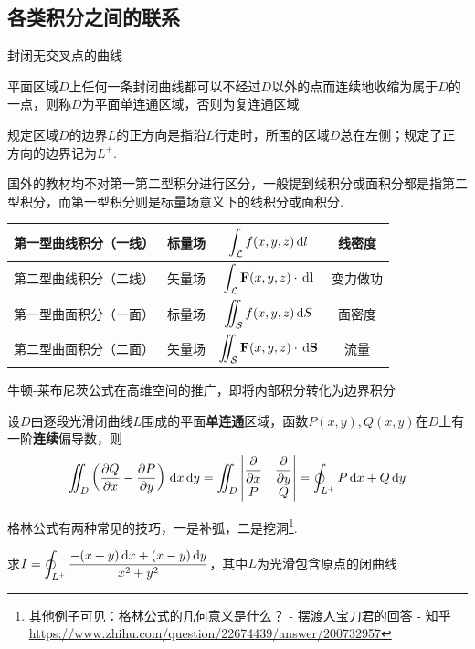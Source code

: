 \subsection{各类积分之间的联系}
\begin{definition}[简单闭曲线]
封闭无交叉点的曲线
\end{definition}
\begin{definition}[连通区域]
平面区域$D$上任何一条封闭曲线都可以不经过$D$以外的点而连续地收缩为属于$D$的一点，则称$D$为平面单连通区域，否则为复连通区域
\end{definition}
\par 规定区域$D$的边界$L$的正方向是指沿$L$行走时，所围的区域$D$总在左侧；规定了正方向的边界记为$L^+$.
\par 国外的教材均不对第一第二型积分进行区分，一般提到线积分或面积分都是指第二型积分，而第一型积分则是标量场意义下的线积分或面积分.
\begin{center}
\begin{tabular}{|c|c|c|c|}\hline
第一型曲线积分（一线） & 标量场 & $\displaystyle\int_{\mathcal{L}} f(x,y,z)\,\mathrm{d} l$ & 线密度\\\hline
第二型曲线积分（二线） & 矢量场 & $\displaystyle\int_{\mathcal{L}}\mathbf{F}(x,y,z)\cdot\,\mathrm{d}\mathbf{l}$ & 变力做功\\\hline
第一型曲面积分（一面） & 标量场 & $\displaystyle\iint_{\mathcal{S}} f(x,y,z)\,\mathrm{d} S$ & 面密度\\\hline
第二型曲面积分（二面） & 矢量场 & $\displaystyle\iint_{\mathcal{S}}\mathbf{F}(x,y,z)\cdot\,\mathrm{d}\mathbf{S}$ & 流量\\\hline
\end{tabular}
\end{center}
\par 牛顿-莱布尼茨公式在高维空间的推广，即将内部积分转化为边界积分
\begin{theorem}[格林(Green)公式]
设$D$由逐段光滑闭曲线$L$围成的平面\textbf{单连通}区域，函数$P(x,y),Q(x,y)$在$D$上有一阶\textbf{连续}偏导数，则
\[\iint_D\left(\dfrac{\partial Q}{\partial x}-\dfrac{\partial P}{\partial y}\right)\,\mathrm{d} x\,\mathrm{d} y=\iint_D\begin{vmatrix}\dfrac{\partial }{\partial x}&\dfrac{\partial }{\partial y}\\P&Q\end{vmatrix}=\oint_{L^+}P\,\mathrm{d} x+Q\,\mathrm{d} y\]
\end{theorem}
\par 格林公式有两种常见的技巧，一是补弧，二是挖洞\footnote{其他例子可见：格林公式的几何意义是什么？ - 摆渡人宝刀君的回答 - 知乎
\url{https://www.zhihu.com/question/22674439/answer/200732957}}.
\begin{example}
求$\displaystyle I=\oint_{L^+}\frac{-(x+y)\,\mathrm{d} x+(x-y)\,\mathrm{d} y}{x^2+y^2}$，其中$L$为光滑包含原点的闭曲线
\end{example}
